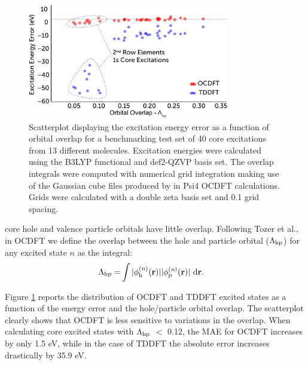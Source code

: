 \documentclass[12pt]{article}
\begin{document}
\begin{figure}[!t]
\centering
\includegraphics[width=8.8cm]{scatterNEWER3.pdf}
\caption{Scatterplot displaying the excitation energy error as a function of orbital overlap for a benchmarking test set of 40 core excitations from 13 different molecules. Excitation energies were calculated using the B3LYP functional and def2-QZVP basis set. The overlap integrals were computed with numerical grid integration making use of the Gaussian cube files produced by in Psi4 OCDFT calculations. Grids were calculated with a double zeta basis set and 0.1 grid spacing.}
\label{figure:scatter}
\end{figure}
core hole and valence particle orbitals have little overlap. Following Tozer et al.,\cite{peach_excitation_2008} in OCDFT we define the overlap between the hole and particle orbital ($\Lambda_{\rm hp}$) for any excited state $n$ as the integral:
\begin{align}
\Lambda_{\rm hp} = &\int |\phi^{(n)}_{\rm h} (\bf{r})||\phi^{(\textit{n})}_{\rm p} (\bf{r})| \ \rm d\bf{r}  .
\end{align}

Figure \ref{figure:scatter} reports the distribution of OCDFT and TDDFT excited states as a function of the energy error and the hole/particle orbital overlap. The scatterplot clearly shows that OCDFT is less sensitive to variations in the overlap. When calculating core excited states with $\Lambda_{\rm hp}$ $<$ 0.12, the MAE for OCDFT increases by only 1.5 eV, while in the case of TDDFT the absolute error increases drastically by 35.9 eV.
\end{document}
